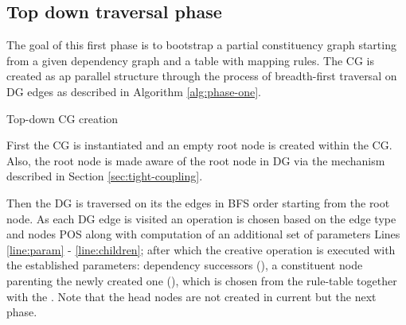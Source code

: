 \subsection{Top down traversal phase}
\label{sec:first-phase}

The goal of this first phase is to bootstrap a partial constituency graph starting from a given dependency graph and a table with mapping rules. The CG is created as ap parallel structure through the process of breadth-first traversal on DG edges as described in Algorithm \ref{alg:phase-one}.

\begin{algorithm}[H]
	\caption{Top-down CG creation}
	\label{alg:phase-one}
\end{algorithm}

First the CG is instantiated and an empty root node is created within the CG. Also, the root node is made aware of the root node in DG via the mechanism described in Section \ref{sec:tight-coupling}.

Then the DG is traversed on its the edges in BFS order starting from the root node. As each DG edge is visited an operation is chosen based on the edge type and nodes POS along with computation of an additional set of parameters Lines \ref{line:param} - \ref{line:children}; after which the creative operation is executed with the established parameters: dependency successors (\Children), a constituent node parenting the newly created one (\cgPointer), \elementType which is chosen from the rule-table together with the \operation. Note that the head nodes are not created in current but the next phase. 

